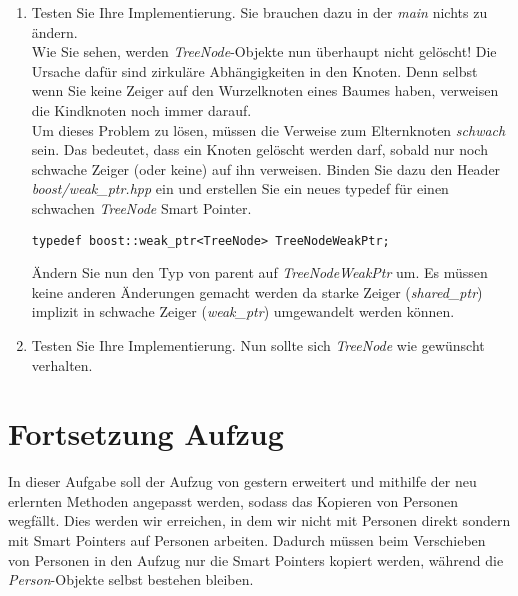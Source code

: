\documentclass[
  accentcolor=tud1c,	%
  colorbacktitle,		%
  inverttitle,			%
  german,				%
  twoside
]{tudexercise}
\begin{document}
\begin{enumerate}
\item
Testen Sie Ihre Implementierung. Sie brauchen dazu in der \emph{main} nichts zu ändern.\\

Wie Sie sehen, werden \emph{TreeNode}-Objekte nun überhaupt nicht gelöscht! Die Ursache dafür sind zirkuläre Abhängigkeiten in den Knoten. Denn selbst wenn Sie keine Zeiger auf den Wurzelknoten eines Baumes haben, verweisen die Kindknoten noch immer darauf. \\

Um dieses Problem zu lösen, müssen die Verweise zum Elternknoten \emph{schwach} sein. Das bedeutet, dass ein Knoten gelöscht werden darf, sobald nur noch schwache Zeiger (oder keine) auf ihn verweisen. Binden Sie dazu den Header \emph{boost/weak\_ptr.hpp} ein und erstellen Sie ein neues typedef für einen schwachen \emph{TreeNode} Smart Pointer.

\begin{lstlisting}
typedef boost::weak_ptr<TreeNode> TreeNodeWeakPtr;
\end{lstlisting}

Ändern Sie nun den Typ von parent auf \emph{TreeNodeWeakPtr} um. Es müssen keine anderen Änderungen gemacht werden da starke Zeiger (\emph{shared\_ptr}) implizit in schwache Zeiger (\emph{weak\_ptr}) umgewandelt werden können.

\item
Testen Sie Ihre Implementierung. Nun sollte sich \emph{TreeNode} wie gewünscht verhalten.

\end{enumerate}

\section{Fortsetzung Aufzug}
In dieser Aufgabe soll der Aufzug von gestern erweitert und mithilfe der neu erlernten Methoden angepasst werden, sodass das Kopieren von Personen wegfällt. Dies werden wir erreichen, in dem wir nicht mit Personen direkt sondern mit Smart Pointers auf Personen arbeiten. Dadurch müssen beim Verschieben von Personen in den Aufzug nur die Smart Pointers kopiert werden, während die \emph{Person}-Objekte selbst bestehen bleiben.
\end{document}
